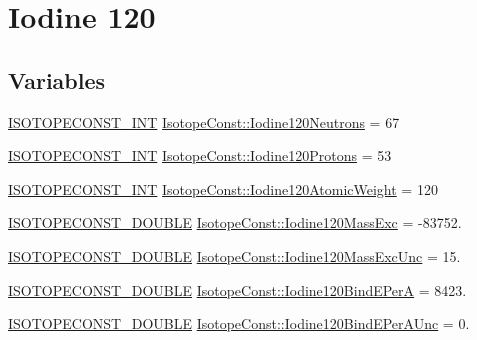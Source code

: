 \hypertarget{group___isotope_const-_iodine-_i120}{}\section{Iodine 120}
\label{group___isotope_const-_iodine-_i120}
\subsection*{Variables}
\begin{DoxyCompactItemize}
\item 
\mbox{\hyperlink{group___isotope_const-_macros_ga5f18360b3e99483a35c32d789e62621c}{I\+S\+O\+T\+O\+P\+E\+C\+O\+N\+S\+T\+\_\+\+I\+NT}} \mbox{\hyperlink{group___isotope_const-_iodine-_i120_ga9221e4197d9e3240b994f5353d030338}{Isotope\+Const\+::\+Iodine120\+Neutrons}} = 67
\item 
\mbox{\hyperlink{group___isotope_const-_macros_ga5f18360b3e99483a35c32d789e62621c}{I\+S\+O\+T\+O\+P\+E\+C\+O\+N\+S\+T\+\_\+\+I\+NT}} \mbox{\hyperlink{group___isotope_const-_iodine-_i120_ga8e06869a2bfebe6c780abdd815a1ebb3}{Isotope\+Const\+::\+Iodine120\+Protons}} = 53
\item 
\mbox{\hyperlink{group___isotope_const-_macros_ga5f18360b3e99483a35c32d789e62621c}{I\+S\+O\+T\+O\+P\+E\+C\+O\+N\+S\+T\+\_\+\+I\+NT}} \mbox{\hyperlink{group___isotope_const-_iodine-_i120_ga21ff2a72e2382c1277f8fb7727cc2d6f}{Isotope\+Const\+::\+Iodine120\+Atomic\+Weight}} = 120
\item 
\mbox{\hyperlink{group___isotope_const-_macros_ga8f45a7272ce02c0b4c65c44636ed719a}{I\+S\+O\+T\+O\+P\+E\+C\+O\+N\+S\+T\+\_\+\+D\+O\+U\+B\+LE}} \mbox{\hyperlink{group___isotope_const-_iodine-_i120_ga347dc4e36dfa8c6646157fe11f1d2bbf}{Isotope\+Const\+::\+Iodine120\+Mass\+Exc}} = -\/83752.
\item 
\mbox{\hyperlink{group___isotope_const-_macros_ga8f45a7272ce02c0b4c65c44636ed719a}{I\+S\+O\+T\+O\+P\+E\+C\+O\+N\+S\+T\+\_\+\+D\+O\+U\+B\+LE}} \mbox{\hyperlink{group___isotope_const-_iodine-_i120_gaa4b48d1086a7e14ec10d20da69bf10af}{Isotope\+Const\+::\+Iodine120\+Mass\+Exc\+Unc}} = 15.
\item 
\mbox{\hyperlink{group___isotope_const-_macros_ga8f45a7272ce02c0b4c65c44636ed719a}{I\+S\+O\+T\+O\+P\+E\+C\+O\+N\+S\+T\+\_\+\+D\+O\+U\+B\+LE}} \mbox{\hyperlink{group___isotope_const-_iodine-_i120_gac5da1eb0cc2b02bfeb4645f840e9e0be}{Isotope\+Const\+::\+Iodine120\+Bind\+E\+PerA}} = 8423.
\item 
\mbox{\hyperlink{group___isotope_const-_macros_ga8f45a7272ce02c0b4c65c44636ed719a}{I\+S\+O\+T\+O\+P\+E\+C\+O\+N\+S\+T\+\_\+\+D\+O\+U\+B\+LE}} \mbox{\hyperlink{group___isotope_const-_iodine-_i120_ga25d63e0eb7c98196cecaceb1efc41711}{Isotope\+Const\+::\+Iodine120\+Bind\+E\+Per\+A\+Unc}} = 0.

\end{DoxyCompactItemize}
